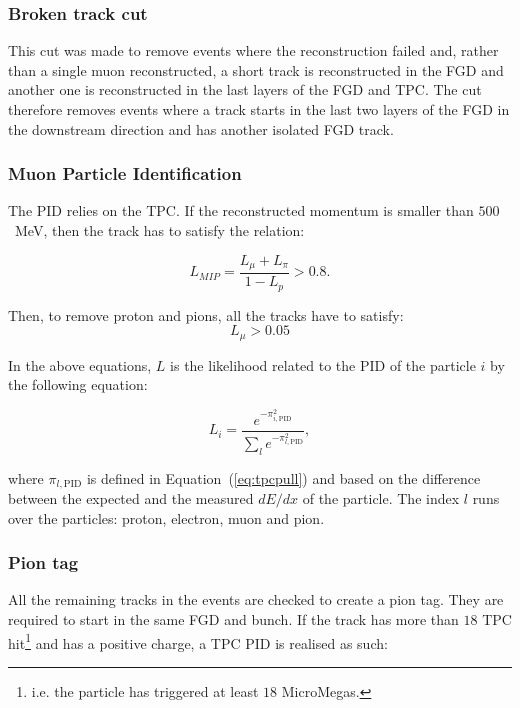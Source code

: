 \subsubsection{Broken track cut}
This cut was made to remove events where the reconstruction failed and,
rather than a single muon reconstructed, a short track is
reconstructed in the \Gls{FGD} and another one is reconstructed in the
last layers of the \Gls{FGD} and \Gls{TPC}. The cut therefore removes
events where a track starts in the last two layers of the \Gls{FGD} in
the downstream direction and has another isolated \Gls{FGD} track.

\subsubsection{Muon Particle Identification}
The \Gls{PID} relies on the \Gls{TPC}. If the reconstructed momentum
is smaller than $500$~MeV, then the track has to satisfy the relation:

\begin{equation}
  L_{MIP} = \frac{L_{\mu} + L_{\pi}}{1-L_p} >0.8.
\end{equation}

Then, to remove proton and pions, all the tracks have to satisfy:
\begin{equation}
  L_{\mu} > 0.05
\end{equation}

In the above equations, $L$ is the likelihood related to the \Gls{PID}
of the particle $i$ by the following equation:

\begin{equation}
  L_i = \frac{e^{-\pi_{i,\text{PID}}^2}}{\sum_l e^{-\pi_{l,\text{PID}}^2}},
  \label{eq:tpcpidlike}
\end{equation}

where $\pi_{l,\text{PID}}$ is defined in Equation~(\ref{eq:tpcpull})
and based on the difference between the expected and the measured
$dE/dx$ of the particle. The index $l$ runs over the particles:
proton, electron, muon and pion.

\subsubsection{Pion tag}
All the remaining tracks in the events are checked to create a pion
tag. They are required to start in the same \Gls{FGD} and bunch. If
the track has more than $18$ \Gls{TPC} hit\footnote{i.e. the particle
  has triggered at least $18$ MicroMegas.} and has a positive charge,
a \Gls{TPC} \Gls{PID} is realised as such:

